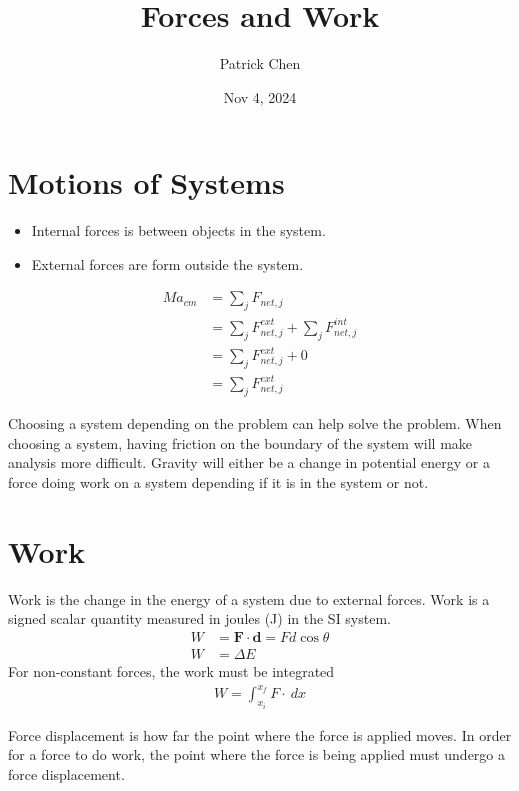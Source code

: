 \documentclass{article}
\title{Forces and Work}
\author{Patrick Chen}
\date{Nov 4, 2024}
\theoremstyle{mytheoremstyle}
\theoremstyle{mytheoremstyle}
\theoremstyle{myproblemstyle}
\begin{document}
    \maketitle

    \section*{Motions of Systems}
    \begin{itemize}
        \item Internal forces is between objects in the system.
        \item External forces are form outside the system.
    \end{itemize}

    \begin{align*}
        Ma_{cm} &= \sum_j F_{net,j} \\
                &= \sum_j F_{net,j}^{ext} + \sum_j F_{net,j}^{int} \\
                &= \sum_j F_{net,j}^{ext} + 0 \\
                &= \sum_j F_{net,j}^{ext}
    \end{align*}

    Choosing a system depending on the problem can help solve the problem. When
    choosing a system, having friction on the boundary of the system will make
    analysis more difficult. Gravity will either be a change in potential energy
    or a force doing work on a system depending if it is in the system or not.

    \section*{Work}
    Work is the change in the energy of a system due to external forces. Work is
    a signed scalar quantity measured in joules (J) in the SI system.
    \begin{align*}
        W &= \mathbf{F} \cdot \mathbf{d} = Fd\cos\theta \\
        W &= \Delta E
    \end{align*}
    For non-constant forces, the work must be integrated
    \begin{align*}
        W = \int_{x_i}^{x_f} F \cdot \ dx
    \end{align*}

    Force displacement is how far the point where the force is applied moves. In
    order for a force to do work, the point where the force is being applied
    must undergo a force displacement.
\end{document}
